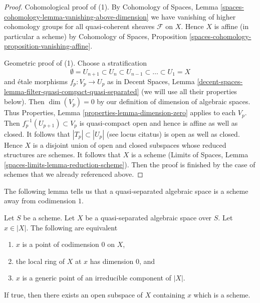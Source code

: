 \begin{proof}
\medskip\noindent
Cohomological proof of (1). By Cohomology of Spaces, Lemma
\ref{spaces-cohomology-lemma-vanishing-above-dimension}
we have vanishing of higher cohomology groups for all
quasi-coherent sheaves $\mathcal{F}$ on $X$. Hence $X$
is affine (in particular a scheme) by
Cohomology of Spaces, Proposition
\ref{spaces-cohomology-proposition-vanishing-affine}.

\medskip\noindent
Geometric proof of (1). Choose a stratification
$$
\emptyset = U_{n + 1} \subset
U_n \subset U_{n - 1} \subset \ldots \subset U_1 = X
$$
and \'etale morphisms $f_p : V_p \to U_p$ as in
Decent Spaces, Lemma
\ref{decent-spaces-lemma-filter-quasi-compact-quasi-separated}
(we will use all their properties below).
Then $\dim(V_p) = 0$ by our definition of dimension of algebraic
spaces. Thus Properties, Lemma \ref{properties-lemma-dimension-zero}
applies to each $V_p$. Then $f_p^{-1}(U_{p + 1}) \subset V_p$
is quasi-compact open and hence is affine as well as closed.
It follows that $|T_p| \subset |U_p|$ (see locus citatus)
is open as well as closed. Hence $X$ is a disjoint union
of open and closed subspaces whose reduced structures are schemes.
It follows that $X$ is a scheme
(Limits of Spaces, Lemma \ref{spaces-limits-lemma-reduction-scheme}).
Then the proof is finished by the case of schemes that we
already referenced above.
\end{proof}

\noindent
The following lemma tells us that a quasi-separated algebraic space
is a scheme away from codimension $1$.

\begin{lemma}
\label{lemma-generic-point-in-schematic-locus}
Let $S$ be a scheme. Let $X$ be a quasi-separated algebraic space over $S$.
Let $x \in |X|$. The following are equivalent
\begin{enumerate}
\item $x$ is a point of codimension $0$ on $X$,
\item the local ring of $X$ at $x$ has dimension $0$, and
\item $x$ is a generic point of an irreducible component of $|X|$.
\end{enumerate}
If true, then there exists an open subspace of $X$
containing $x$ which is a scheme.
\end{lemma}

